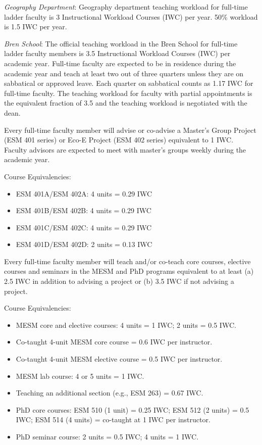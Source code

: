 \documentclass[10pt]{article}
\begin{document}
\begin{enumerate}
{\footnotesize

\item {\em Geography Department}: Geography department teaching workload for full-time ladder faculty is 3 Instructional Workload Courses (IWC) per year. 50\% workload is 1.5 IWC per year.

\item {\em Bren School}:  The official teaching workload in the Bren School for full-time ladder faculty members is 3.5 Instructional Workload Courses (IWC) per academic year. Full-time faculty are expected to be in residence during the academic year and teach at least two out of three quarters unless they are on sabbatical or approved leave. Each quarter on sabbatical counts as 1.17 IWC for full-time faculty. The teaching workload for faculty with partial appointments is the equivalent fraction of 3.5 and the teaching workload is negotiated with the dean.

Every full-time faculty member will advise or co-advise a Master’s Group Project (ESM 401 series) or Eco-E Project (ESM 402 series) equivalent to 1 IWC. Faculty advisors are expected to meet with master’s groups weekly during the academic year.

Course Equivalencies:
\begin{itemize}
    \item ESM 401A/ESM 402A: 4 units = 0.29 IWC 
    \item ESM 401B/ESM 402B: 4 units = 0.29 IWC
    \item ESM 401C/ESM 402C: 4 units = 0.29 IWC
    \item ESM 401D/ESM 402D: 2 units = 0.13 IWC
\end{itemize}

Every full-time faculty member will teach and/or co-teach core courses, elective courses and seminars in the MESM and PhD programs equivalent to at least (a) 2.5 IWC in addition to advising a project or (b) 3.5 IWC if not advising a project. 

Course Equivalencies:
\begin{itemize}
    \item MESM core and elective courses: 4 units = 1 IWC; 2 units = 0.5 IWC.
    \item Co-taught 4-unit MESM core course = 0.6 IWC per instructor.
    \item Co-taught 4-unit MESM elective course = 0.5 IWC per instructor.
    \item MESM lab course: 4 or 5 units = 1 IWC.
    \item Teaching an additional section (e.g., ESM 263) = 0.67 IWC.
    \item PhD core courses: ESM 510 (1 unit) = 0.25 IWC; ESM 512 (2 units) = 0.5 IWC; ESM 514 (4 units) = co-taught at 1 IWC per instructor.
    \item PhD seminar course: 2 units = 0.5 IWC; 4 units = 1 IWC.
\end{itemize}

}
\end{enumerate}
\end{document}
